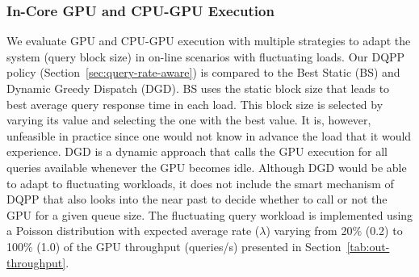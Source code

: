 \subsubsection{In-Core GPU and CPU-GPU Execution}

We evaluate GPU and CPU-GPU execution with multiple strategies to
adapt the system (query block size) in on-line scenarios with fluctuating 
loads. Our DQPP policy (Section~\ref{sec:query-rate-aware}) is compared
to the Best Static (BS) and Dynamic Greedy Dispatch (DGD). BS uses
the static block size that leads to best average query response time in 
each load. This block size is selected by varying its value and selecting
the one with the best value. It is, however, unfeasible in practice since
one would not know in advance the load that it would experience. DGD is a dynamic
approach that calls the GPU execution for all queries available 
whenever the GPU becomes idle. Although DGD would be able to adapt to fluctuating workloads, it
does not include the smart mechanism of DQPP that also looks into
the near past to decide whether to call or not the GPU for a given queue size.
The fluctuating query workload is implemented using a Poisson distribution 
with expected average rate ($\lambda$) varying from 20\% (0.2) to 100\% (1.0) 
of the GPU throughput (queries/s) presented in Section~\ref{tab:out-throughput}.

\begin{table}[htbp]
\caption{Average query response time (secs.) with varying query rates using a Poisson distribution ($\lambda\ \times$ maximum throughput) for GPU only and CPU-GPU execution.}
\vspace{-4mm}
\begin{center}
\label{tab:in-core-gpu-rt}
\end{center}
\end{table}



